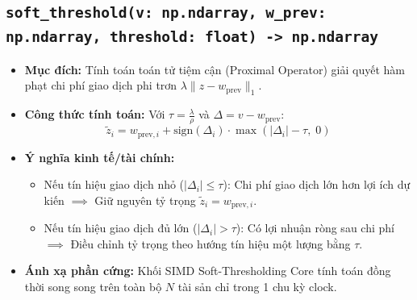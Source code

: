 \documentclass[12pt,a4paper]{article}
\begin{document}
\subsection{\texttt{soft\_threshold(v: np.ndarray, w\_prev: np.ndarray, threshold: float) -> np.ndarray}}
\begin{itemize}[leftmargin=1.5em]
    \item \textbf{Mục đích:} Tính toán toán tử tiệm cận (Proximal Operator) giải quyết hàm phạt chi phí giao dịch phi trơn $\lambda \|z - w_{\text{prev}}\|_1$.
    \item \textbf{Công thức tính toán:} Với $\tau = \frac{\lambda}{\rho}$ và $\Delta = v - w_{\text{prev}}$:
    \begin{equation}
        \tilde{z}_i = w_{\text{prev}, i} + \text{sign}(\Delta_i) \cdot \max(|\Delta_i| - \tau, \; 0)
    \end{equation}
    \item \textbf{Ý nghĩa kinh tế/tài chính:}
    \begin{itemize}
        \item Nếu tín hiệu giao dịch nhỏ ($|\Delta_i| \le \tau$): Chi phí giao dịch lớn hơn lợi ích dự kiến $\implies$ Giữ nguyên tỷ trọng $\tilde{z}_i = w_{\text{prev}, i}$.
        \item Nếu tín hiệu giao dịch đủ lớn ($|\Delta_i| > \tau$): Có lợi nhuận ròng sau chi phí $\implies$ Điều chỉnh tỷ trọng theo hướng tín hiệu một lượng bằng $\tau$.
    \end{itemize}
    \item \textbf{Ánh xạ phần cứng:} Khối SIMD Soft-Thresholding Core tính toán đồng thời song song trên toàn bộ $N$ tài sản chỉ trong 1 chu kỳ clock.
\end{itemize}
\end{document}
